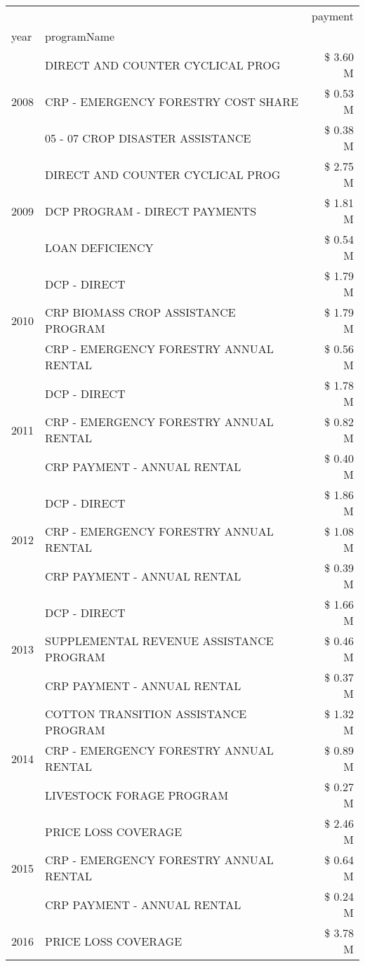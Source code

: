 \begin{tabular}{llr}
\toprule
 &  & payment \\
year & programName &  \\
\midrule
\multirow[t]{3}{*}{2008} & DIRECT AND COUNTER CYCLICAL PROG & \$ 3.60 M \\
 & CRP - EMERGENCY FORESTRY COST SHARE & \$ 0.53 M \\
 & 05 - 07 CROP DISASTER ASSISTANCE & \$ 0.38 M \\
\cline{1-3}
\multirow[t]{3}{*}{2009} & DIRECT AND COUNTER CYCLICAL PROG & \$ 2.75 M \\
 & DCP PROGRAM - DIRECT PAYMENTS & \$ 1.81 M \\
 & LOAN DEFICIENCY & \$ 0.54 M \\
\cline{1-3}
\multirow[t]{3}{*}{2010} & DCP - DIRECT & \$ 1.79 M \\
 & CRP BIOMASS CROP ASSISTANCE PROGRAM & \$ 1.79 M \\
 & CRP - EMERGENCY FORESTRY ANNUAL RENTAL & \$ 0.56 M \\
\cline{1-3}
\multirow[t]{3}{*}{2011} & DCP - DIRECT & \$ 1.78 M \\
 & CRP - EMERGENCY FORESTRY ANNUAL RENTAL & \$ 0.82 M \\
 & CRP PAYMENT - ANNUAL RENTAL & \$ 0.40 M \\
\cline{1-3}
\multirow[t]{3}{*}{2012} & DCP - DIRECT & \$ 1.86 M \\
 & CRP - EMERGENCY FORESTRY ANNUAL RENTAL & \$ 1.08 M \\
 & CRP PAYMENT - ANNUAL RENTAL & \$ 0.39 M \\
\cline{1-3}
\multirow[t]{3}{*}{2013} & DCP - DIRECT & \$ 1.66 M \\
 & SUPPLEMENTAL REVENUE ASSISTANCE PROGRAM & \$ 0.46 M \\
 & CRP PAYMENT - ANNUAL RENTAL & \$ 0.37 M \\
\cline{1-3}
\multirow[t]{3}{*}{2014} & COTTON TRANSITION ASSISTANCE PROGRAM & \$ 1.32 M \\
 & CRP - EMERGENCY FORESTRY ANNUAL RENTAL & \$ 0.89 M \\
 & LIVESTOCK FORAGE PROGRAM & \$ 0.27 M \\
\cline{1-3}
\multirow[t]{3}{*}{2015} & PRICE LOSS COVERAGE & \$ 2.46 M \\
 & CRP - EMERGENCY FORESTRY ANNUAL RENTAL & \$ 0.64 M \\
 & CRP PAYMENT - ANNUAL RENTAL & \$ 0.24 M \\
\cline{1-3}
\multirow[t]{3}{*}{2016} & PRICE LOSS COVERAGE & \$ 3.78 M \\

\end{tabular}
